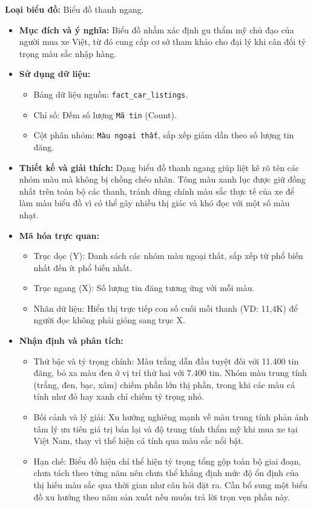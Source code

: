 \noindent\textbf{Loại biểu đồ:} Biểu đồ thanh ngang.

\begin{itemize}
    \item \textbf{Mục đích và ý nghĩa:} Biểu đồ nhằm xác định gu thẩm mỹ chủ đạo của người mua xe Việt, từ đó cung cấp cơ sở tham khảo cho đại lý khi cân đối tỷ trọng màu sắc nhập hàng.
    
    \item \textbf{Sử dụng dữ liệu:}
    \begin{itemize}
        \item Bảng dữ liệu nguồn: \texttt{fact\_car\_listings}.
        \item Chỉ số: Đếm số lượng \texttt{Mã tin} (Count).
        \item Cột phân nhóm: \texttt{Màu ngoại thất}, sắp xếp giảm dần theo số lượng tin đăng.
    \end{itemize}
    
    \item \textbf{Thiết kế và giải thích:} Dạng biểu đồ thanh ngang giúp liệt kê rõ tên các nhóm màu mà không bị chồng chéo nhãn. Tông màu xanh lục được giữ đồng nhất trên toàn bộ các thanh, tránh dùng chính màu sắc thực tế của xe để làm màu biểu đồ vì có thể gây nhiễu thị giác và khó đọc với một số màu nhạt.
    
    \item \textbf{Mã hóa trực quan:}
    \begin{itemize}
        \item Trục dọc (Y): Danh sách các nhóm màu ngoại thất, sắp xếp từ phổ biến nhất đến ít phổ biến nhất.
        \item Trục ngang (X): Số lượng tin đăng tương ứng với mỗi màu.
        \item Nhãn dữ liệu: Hiển thị trực tiếp con số cuối mỗi thanh (VD: 11,4K) để người đọc không phải gióng sang trục X.
    \end{itemize}
    
    \item \textbf{Nhận định và phân tích:}
    \begin{itemize}
        \item Thứ bậc và tỷ trọng chính: Màu trắng dẫn đầu tuyệt đối với 11.400 tin đăng, bỏ xa màu đen ở vị trí thứ hai với 7.400 tin. Nhóm màu trung tính (trắng, đen, bạc, xám) chiếm phần lớn thị phần, trong khi các màu cá tính như đỏ hay xanh chỉ chiếm tỷ trọng nhỏ.
        \item Bối cảnh và lý giải: Xu hướng nghiêng mạnh về màu trung tính phản ánh tâm lý ưu tiên giá trị bán lại và độ trung tính thẩm mỹ khi mua xe tại Việt Nam, thay vì thể hiện cá tính qua màu sắc nổi bật.
        \item Hạn chế: Biểu đồ hiện chỉ thể hiện tỷ trọng tổng gộp toàn bộ giai đoạn, chưa tách theo từng năm nên chưa thể khẳng định mức độ ổn định của thị hiếu màu sắc qua thời gian như câu hỏi đặt ra. Cần bổ sung một biểu đồ xu hướng theo năm sản xuất nếu muốn trả lời trọn vẹn phần này.
    \end{itemize}
\end{itemize}



